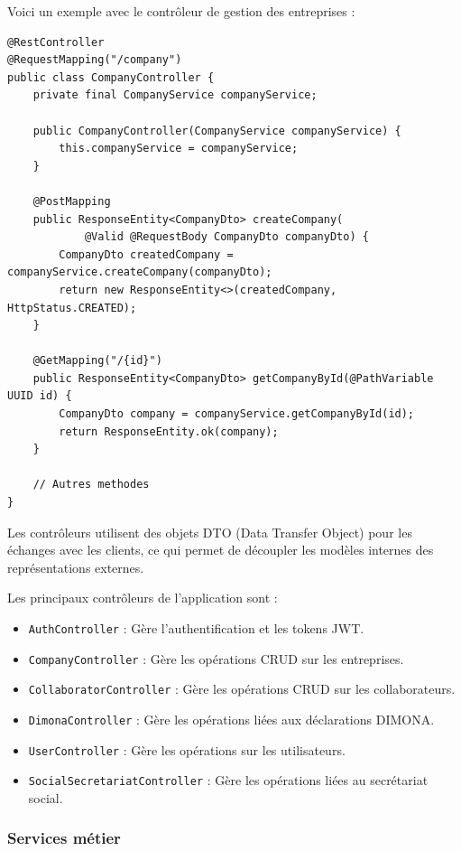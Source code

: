 \documentclass[12pt,a4paper]{report}
\begin{document}
Voici un exemple avec le contrôleur de gestion des entreprises :

\begin{lstlisting}
@RestController
@RequestMapping("/company")
public class CompanyController {
    private final CompanyService companyService;
    
    public CompanyController(CompanyService companyService) {
        this.companyService = companyService;
    }
    
    @PostMapping
    public ResponseEntity<CompanyDto> createCompany(
            @Valid @RequestBody CompanyDto companyDto) {
        CompanyDto createdCompany = companyService.createCompany(companyDto);
        return new ResponseEntity<>(createdCompany, HttpStatus.CREATED);
    }
    
    @GetMapping("/{id}")
    public ResponseEntity<CompanyDto> getCompanyById(@PathVariable UUID id) {
        CompanyDto company = companyService.getCompanyById(id);
        return ResponseEntity.ok(company);
    }
    
    // Autres methodes
}
\end{lstlisting}

Les contrôleurs utilisent des objets DTO (Data Transfer Object) pour les échanges avec les clients, ce qui permet de découpler les modèles internes des représentations externes.

Les principaux contrôleurs de l'application sont :
\begin{itemize}
  \item \texttt{AuthController} : Gère l'authentification et les tokens JWT.
  \item \texttt{CompanyController} : Gère les opérations CRUD sur les entreprises.
  \item \texttt{CollaboratorController} : Gère les opérations CRUD sur les collaborateurs.
  \item \texttt{DimonaController} : Gère les opérations liées aux déclarations DIMONA.
  \item \texttt{UserController} : Gère les opérations sur les utilisateurs.
  \item \texttt{SocialSecretariatController} : Gère les opérations liées au secrétariat social.
\end{itemize}

\subsubsection{Services métier}
\end{document}
